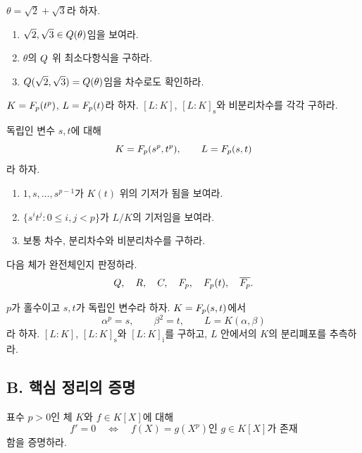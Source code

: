 \begin{exercise}[*]
$\theta=\sqrt2+\sqrt3$라 하자.
\begin{enumerate}[label=(\alph*)]
  \item $\sqrt2,\sqrt3\in Q(\theta)$임을 보여라.
  \item $\theta$의 $Q$ 위 최소다항식을 구하라.
  \item $Q(\sqrt2,\sqrt3)=Q(\theta)$임을 차수로도 확인하라.
\end{enumerate}
\end{exercise}

\begin{exercise}
$K=F_p(t^p)$, $L=F_p(t)$라 하자. $[L:K]$, $[L:K]_{\mathrm s}$와 비분리차수를 각각 구하라.
\end{exercise}

\begin{exercise}[*]
독립인 변수 $s,t$에 대해
\[
  K=F_p(s^p,t^p),
  \qquad
  L=F_p(s,t)
\]
라 하자.
\begin{enumerate}[label=(\alph*)]
  \item $1,s,\dots,s^{p-1}$가 $K(t)$ 위의 기저가 됨을 보여라.
  \item $\{s^it^j:0\le i,j<p\}$가 $L/K$의 기저임을 보여라.
  \item 보통 차수, 분리차수와 비분리차수를 구하라.
\end{enumerate}
\end{exercise}

\begin{exercise}
다음 체가 완전체인지 판정하라.
\[
  Q,\quad R,\quad C,\quad F_p,
  \quad F_p(t),\quad \overline{F_p}.
\]
\end{exercise}

\begin{exercise}[*]
$p$가 홀수이고 $s,t$가 독립인 변수라 하자. $K=F_p(s,t)$에서
\[
  \alpha^p=s,
  \qquad
  \beta^2=t,
  \qquad
  L=K(\alpha,\beta)
\]
라 하자. $[L:K]$, $[L:K]_{\mathrm s}$와 $[L:K]_{\mathrm i}$를 구하고, $L$ 안에서의 $K$의 분리폐포를 추측하라.
\end{exercise}

\subsection*{B. 핵심 정리의 증명}

\begin{exercise}[*]
표수 $p>0$인 체 $K$와 $f\in K[X]$에 대해
\[
  f'=0
  \quad\Longleftrightarrow\quad
  f(X)=g(X^p)\text{인 }g\in K[X]\text{가 존재}
\]
함을 증명하라.
\end{exercise}

